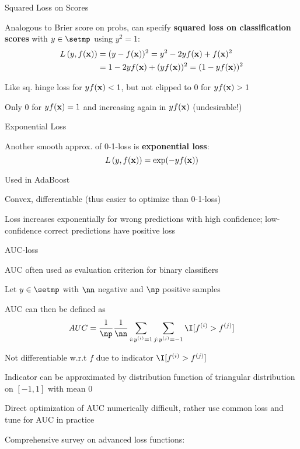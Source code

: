 \documentclass[11pt,compress,t,notes=noshow, xcolor=table]{beamer}
\begin{document}
\begin{framei}[sep=M]{Squared Loss on Scores}


  \item Analogous to Brier score on probs, can specify \textbf{squared loss on classification scores} with $y \in \setmp$ using $y^2=1$:
  \begin{align*}
  L\left(y, f(\mathbf{x})\right) &=(y - f(\mathbf{x}))^2 = y^2 - 2yf(\mathbf{x}) + f(\mathbf{x})^2\\
  &=1 - 2yf(\mathbf{x}) + (yf(\mathbf{x}))^2 = (1 - yf(\mathbf{x}))^2
  \end{align*}
  \item Like sq. hinge loss for $yf(\mathbf{x}) < 1$, but not clipped to $0$ for $yf(\mathbf{x})>1$
  \item Only 0 for $yf(\mathbf{x}) = 1$ and increasing again in $yf(\mathbf{x})$ (undesirable!)



\end{framei}



\begin{framei}[sep=M]{Exponential Loss}

\item Another smooth 
approx. of 0-1-loss is \textbf{exponential loss}:
$$L\left(y, f(\mathbf{x})\right) = \exp(-yf(\mathbf{x}))$$ 
\item Used in AdaBoost
\item Convex, differentiable (thus easier to optimize than 0-1-loss)
\item Loss increases exponentially for wrong predictions with high confidence; low-confidence correct predictions have positive loss


\end{framei}

\begin{framei}{AUC-loss}
\item AUC often used as evaluation criterion for binary classifiers
\item Let $y \in \setmp$ with $\nn$ negative and $\np$ positive samples %
\item AUC can then be defined as
$$AUC = \frac{1}{\np} \frac{1}{\nn} \sum_{i: \yi = 1} \sum_{j: \yi[j] = -1} \I [f^{(i)} > f^{(j)}]$$
\item Not differentiable w.r.t $f$ due to indicator $\I [f^{(i)} > f^{(j)}]$
\item Indicator can be approximated by distribution function of triangular distribution on $[-1, 1]$ with mean $0$
\item Direct optimization of AUC numerically difficult, rather use common loss and tune for AUC in practice
\item Comprehensive survey on advanced loss functions: 

\end{framei}

\endlecture
\end{document}
